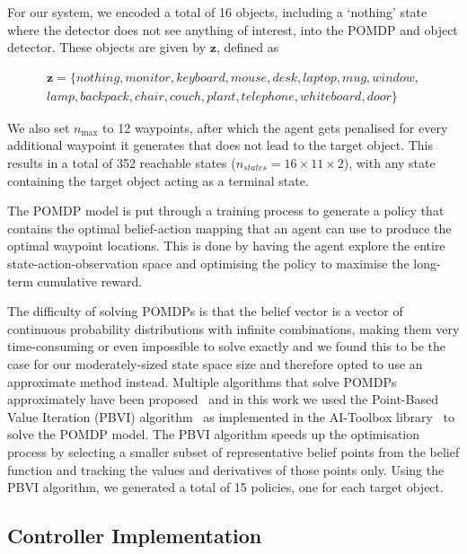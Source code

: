 \documentclass[runningheads]{llncs}
\begin{document}
For our system, we encoded a total of 16 objects, including a `nothing' state where the detector does not see anything of interest, into the POMDP and object detector. These objects are given by $\mathbf{z}$, defined as 

\begin{equation}
  \begin{split}
    \mathbf{z} = \{ nothing, monitor, keyboard, mouse, desk, laptop, mug, window,\\ 
      lamp, backpack, chair, couch, plant, telephone, whiteboard, door \}
  \end{split}
\end{equation}

We also set $n_{\max}$ to 12 waypoints, after which the agent gets penalised for every additional waypoint it generates that does not lead to the target object. 
This results in a total of 352 reachable states ($n_{states} = 16\times11\times2$), with any state containing the target object acting as a terminal state.

The POMDP model is put through a training process to generate a policy that contains the optimal belief-action mapping that an agent can use to produce the optimal waypoint locations.
This is done by having the agent explore the entire state-action-observation space and optimising the policy to maximise the long-term cumulative reward.

The difficulty of solving POMDPs is that the belief vector is a vector of continuous probability distributions with infinite combinations, making them very time-consuming or even impossible to solve exactly and we found this to be the case for our moderately-sized state space size and therefore opted to use an approximate method instead.
Multiple algorithms that solve POMDPs approximately have been proposed~\cite{bargiacchi2016dynamic,kaelbling1998planning,silver2010monte,spaan2005perseus} and in this work we used the Point-Based Value Iteration (PBVI) algorithm~\cite{pineau2003point} as implemented in the AI-Toolbox library~\cite{aitoolbox} to solve the POMDP model.
The PBVI algorithm speeds up the optimisation process by selecting a smaller subset of representative belief points from the belief function and tracking the values and derivatives of those points only. 
Using the PBVI algorithm, we generated a total of 15 policies, one for each target object. 

\subsection{Controller Implementation}
\end{document}
